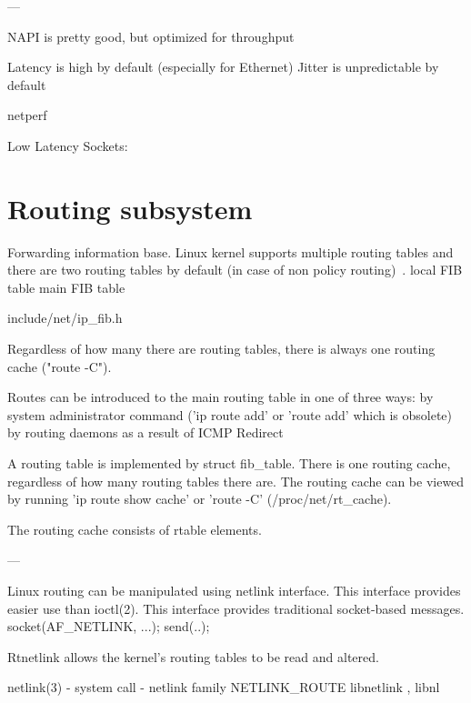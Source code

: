 ---

NAPI is pretty good, but optimized for throughput

Latency is high by default (especially for Ethernet)
Jitter is unpredictable by default

netperf

Low Latency Sockets:




\section{Routing subsystem}
Forwarding information base.
Linux kernel supports multiple routing tables and
there are two routing tables by default (in case of non policy routing)~\cite{haifux-lecture}.
local FIB table
main FIB table

include/net/ip\_fib.h

Regardless of how many there are routing tables, there is always one routing cache ("route -C").


Routes can be introduced to the main routing table in one of three ways:
by system administrator command ('ip route add' or 'route add' which is obsolete)
by routing daemons
as a result of ICMP Redirect

A routing table is implemented by struct fib\_table.
There is one routing cache, regardless of how many routing tables there are.
The routing cache can be viewed by running 'ip route show cache' or 'route -C' (/proc/net/rt\_cache).

The routing cache consists of rtable elements.


---

Linux routing can be manipulated using netlink interface.
This interface provides easier use than ioctl(2).
This interface provides traditional socket-based messages.
socket(AF\_NETLINK, ...);
send(..);

Rtnetlink allows the kernel's routing tables to be read and altered.

netlink(3) - system call - netlink family NETLINK\_ROUTE
libnetlink , libnl
